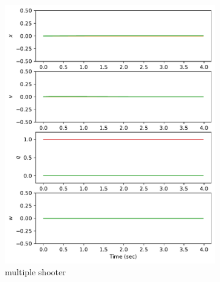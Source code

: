 \documentclass[]{article}
\begin{document}
 \begin{figure}[H]
 	\centering
 	\begin{subfigure}[b]{0.3\textwidth}
 		\centering
 		\includegraphics[width=\textwidth]{figures/statehover3.pdf}
 		\caption{multiple shooter}
 	\end{subfigure}
 	\begin{subfigure}[b]{0.3\textwidth}
 		\centering

\end{subfigure}
\end{figure}
\end{document}
